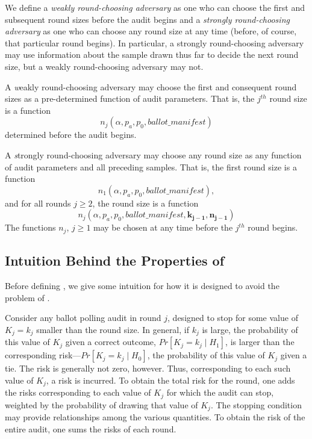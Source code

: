 We define a {\em weakly round-choosing adversary} as one who can choose the first and subsequent round sizes before the audit begins and a {\em strongly round-choosing adversary} as one who can choose any round size at any time (before, of course, that particular round begins). In particular, a strongly round-choosing adversary may use information about the sample drawn thus far to decide the next round size, but a weakly round-choosing adversary may not. 

\begin{definition}
A {\emph weakly round-choosing adversary} may choose the first and consequent round sizes as a pre-determined function of audit parameters. That is, the $j^{th}$ round size is a function $$n_j(\alpha, p_a, p_0, ballot\_manifest)$$ determined before the audit begins. 
\end{definition}

\begin{definition}
A {\emph strongly round-choosing adversary} may choose any round size as any function of audit parameters and all preceding samples. That is, the first round size is a function 
$$n_1(\alpha, p_a, p_0, ballot\_manifest),$$
and for all rounds $j\ge 2$, the round size is a function
$$n_{j}(\alpha, p_a, p_0, ballot\_manifest, \bm{k_{j-1}}, \bm{n_{j-1}})$$ The functions $n_j$, $j \geq 1$ may be chosen at any time before the $j^{th}$ round begins. 
\end{definition}

\subsection{Intuition Behind the Properties of \Providence}
Before defining \Providence, we give some intuition for how it is designed to avoid the problem of \Minerva.

Consider any ballot polling audit in round $j$, designed to stop for some value of $K_j=k_j$ smaller than the round size. In general, if $k_j$ is large, the probability of this value of $K_j$ given a correct outcome, $Pr[K_j = k_j \mid H_1]$, is larger than the corresponding risk---$Pr[K_j = k_j \mid H_0]$, the probability of this value of $K_j$ given a tie. The risk is generally not zero, however. Thus, corresponding to each such value of $K_j$, a risk is incurred. To obtain the total risk for the round, one adds the risks corresponding to each value of $K_j$ for which the audit can stop, weighted by the probability of drawing that value of $K_j$. The stopping condition may provide relationships among the various quantities. To obtain the risk of the entire audit, one sums the risks of each round. 

